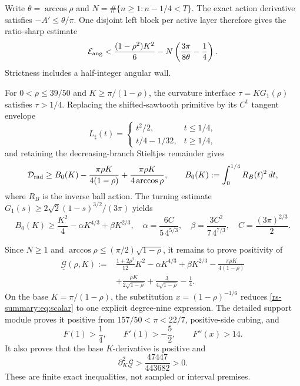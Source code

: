 \documentclass[11pt]{article}
\numberwithin{equation}{section}
\theoremstyle{definition}
\theoremstyle{remark}
\begin{document}
Write $\theta=\arccos\rho$ and
$N=\#\{n\geq1:n-1/4<T\}$.  The exact action derivative satisfies
$-A'\leq\theta/\pi$.  One disjoint left block per active layer therefore
gives the ratio-sharp estimate
\begin{equation}
 \mathcal E_{\rm ang}
 <\frac{(1-\rho^2)K^2}{6}
 -N\left(\frac{3\pi}{8\theta}-\frac14\right).
 \label{rs-summary:eq:angular}
\end{equation}
Strictness includes a half-integer angular wall.

For $0<\rho\leq39/50$ and $K\geq\pi/(1-\rho)$, the curvature interface
$\tau=KG_1(\rho)$ satisfies $\tau>1/4$.  Replacing the shifted-sawtooth
primitive by its $C^1$ tangent envelope
\[
 L_\sharp(t)=
 \begin{cases}t^2/2,&t\leq1/4,\\t/4-1/32,&t\geq1/4,\end{cases}
\]
and retaining the decreasing-branch Stieltjes remainder gives
\begin{equation}
 \mathcal D_{\rm rad}\geq
 B_0(K)-\frac{\pi\rho K}{4(1-\rho)}
 +\frac{\pi\rho K}{4\arccos\rho},
 \qquad
 B_0(K):=\int_0^{1/4}R_B(t)^2\,dt,
 \label{rs-summary:eq:radial}
\end{equation}
where $R_B$ is the inverse ball action.  The turning estimate
$G_1(s)\geq2\sqrt2(1-s)^{3/2}/(3\pi)$ yields
\begin{equation}
 B_0(K)\geq\frac{K^2}{4}-\alpha K^{4/3}+\beta K^{2/3},
 \quad
 \alpha=\frac{6C}{5\,4^{5/3}},\quad
 \beta=\frac{3C^2}{7\,4^{7/3}},\quad
 C=\frac{(3\pi)^{2/3}}2.
 \label{rs-summary:eq:ball}
\end{equation}

Since $N\geq1$ and
$\arccos\rho\leq(\pi/2)\sqrt{1-\rho}$, it remains to prove positivity of
\begin{equation}
 \begin{aligned}
 \underline{\mathcal G}(\rho,K):={}&
 \frac{1+2\rho^2}{12}K^2-\alpha K^{4/3}+\beta K^{2/3}
 -\frac{\pi\rho K}{4(1-\rho)}\\
 &+\frac{\rho K}{2\sqrt{1-\rho}}
 +\frac3{4\sqrt{1-\rho}}-\frac14.
 \end{aligned}
 \label{rs-summary:eq:scalar}
\end{equation}
On the base $K=\pi/(1-\rho)$, the substitution
$x=(1-\rho)^{-1/6}$ reduces \eqref{rs-summary:eq:scalar} to one explicit
degree-nine expression.  The detailed support module proves it positive
from $157/50<\pi<22/7$, positive-side cubing, and
\[
 F(1)>\frac14,\qquad F'(1)>-\frac52,\qquad F''(x)>14.
\]
It also proves that the base $K$-derivative is positive and
\[
 \partial_K^2\underline{\mathcal G}
 >\frac{47447}{443682}>0.
\]
These are finite exact inequalities, not sampled or interval premises.
\end{document}
